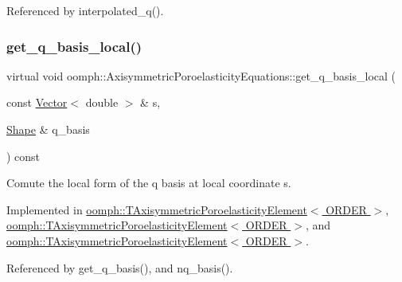 Referenced by interpolated\+\_\+q().

\mbox{\label{classoomph_1_1AxisymmetricPoroelasticityEquations_afe94aaa6d3af8c997c760465b6930c27}} 
\subsubsection{\texorpdfstring{get\+\_\+q\+\_\+basis\+\_\+local()}{get\_q\_basis\_local()}}
{\footnotesize\ttfamily virtual void oomph\+::\+Axisymmetric\+Poroelasticity\+Equations\+::get\+\_\+q\+\_\+basis\+\_\+local (\begin{DoxyParamCaption}\item[{const \hyperlink{classoomph_1_1Vector}{Vector}$<$ double $>$ \&}]{s,  }\item[{\hyperlink{classoomph_1_1Shape}{Shape} \&}]{q\+\_\+basis }\end{DoxyParamCaption}) const\hspace{0.3cm}{\ttfamily [pure virtual]}}



Comute the local form of the q basis at local coordinate s. 



Implemented in \hyperlink{classoomph_1_1TAxisymmetricPoroelasticityElement_a77621158dba7ea8d2095e4162c76583c}{oomph\+::\+T\+Axisymmetric\+Poroelasticity\+Element$<$ O\+R\+D\+E\+R $>$}, \hyperlink{classoomph_1_1TAxisymmetricPoroelasticityElement_a2f616b75cf70b2aead5326609ef03c92}{oomph\+::\+T\+Axisymmetric\+Poroelasticity\+Element$<$ O\+R\+D\+E\+R $>$}, and \hyperlink{classoomph_1_1TAxisymmetricPoroelasticityElement_ad6ac37a3eabec3e5aab6e7c2e7d65b4e}{oomph\+::\+T\+Axisymmetric\+Poroelasticity\+Element$<$ O\+R\+D\+E\+R $>$}.



Referenced by get\+\_\+q\+\_\+basis(), and nq\+\_\+basis().

\mbox{\label{classoomph_1_1AxisymmetricPoroelasticityEquations_a0a27551f83320812212a8f72a67740e2}} 

